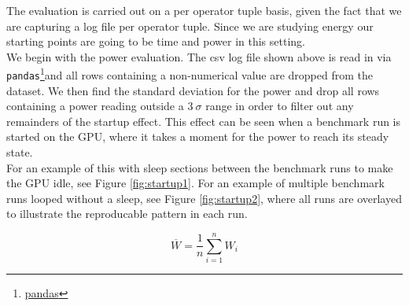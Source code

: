 \documentclass[conference]{IEEEtran}
\begin{document}
The evaluation is carried out on a per operator tuple basis, given the fact that we are capturing a log file per operator tuple. Since we are studying energy our starting points are going to be time and power in this setting. \\ 
We begin with the power evaluation. The csv log file shown above is read in via \texttt{pandas}\footnote{\href{https://pandas.pydata.org/}{pandas}}and all rows containing a non-numerical value are dropped from the dataset. We then find the standard deviation for the power and drop all rows containing a power reading outside a $3 \: \sigma $ range in order to filter out any remainders of the startup effect. This effect can be seen when a benchmark run is started on the GPU, where it takes a moment for the power to reach its steady state. \\
For an example of this with sleep sections between the benchmark runs to make the GPU idle, see Figure \ref{fig:startup1}. For an example of multiple benchmark runs looped without a sleep, see Figure \ref{fig:startup2}, where all runs are overlayed to illustrate the reproducable pattern in each run.



\begin{equation}
\overline{W} = \frac{1}{n} \sum_{i=1}^{n} W_i
\end{equation}
\end{document}

